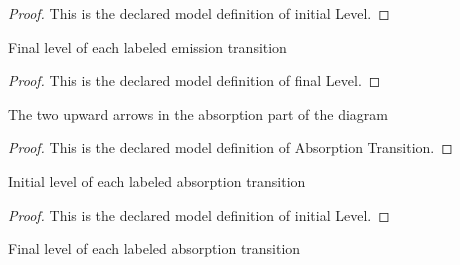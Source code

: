 \begin{proof}
  This is the declared model definition of initial Level.
\end{proof}
\begin{definition}
  \label{def:physics:phyx-mini-0517:phyxminiproblems-problemphyxmini0517-emissiontransition-finallevel}
  Final level of each labeled emission transition
\end{definition}
\begin{proof}
  This is the declared model definition of final Level.
\end{proof}
\begin{definition}
  \label{def:physics:phyx-mini-0517:phyxminiproblems-problemphyxmini0517-absorptiontransition}
  The two upward arrows in the absorption part of the diagram
\end{definition}
\begin{proof}
  This is the declared model definition of Absorption Transition.
\end{proof}
\begin{definition}
  \label{def:physics:phyx-mini-0517:phyxminiproblems-problemphyxmini0517-absorptiontransition-initiallevel}
  Initial level of each labeled absorption transition
\end{definition}
\begin{proof}
  This is the declared model definition of initial Level.
\end{proof}
\begin{definition}
  \label{def:physics:phyx-mini-0517:phyxminiproblems-problemphyxmini0517-absorptiontransition-finallevel}
  Final level of each labeled absorption transition
\end{definition}
